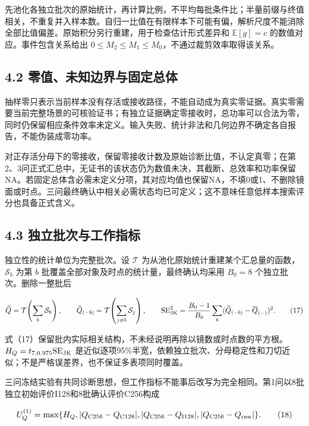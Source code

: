 \documentclass[UTF8,fontset=windows,zihao=-4]{ctexart}
\begin{document}
先池化各独立批次的原始统计，再计算比例，不平均每批条件比；半量前缀与终值相关，不重复并入样本数。自归一比值在有限样本下可能有偏，解析尺度不能消除全部比值偏差。原始积分另行重建，用于检查估计形式差异和 \(\mathbb E[g]=c\) 的数值对应。事件包含关系给出 \(0\le M_2\le M_1\le M_0\)，不通过裁剪效率取得该关系。

\subsection*{4.2 零值、未知边界与固定总体}

抽样零只表示当前样本没有存活或接收路径，不能自动成为真实零证据。真实零需要当前完整场景的可核验证书；有独立证据确定零接收时，总功率可以合法为零，同时仍保留相应条件效率未定义。输入失败、统计非法和几何边界不确定各自报告，不能伪装成零功率。

对正存活分母下的零接收，保留零接收计数及原始诊断比值，不认定真零；在第2、3问正式汇总中，无证书的该状态仍为数值未决，其截断、总效率和功率保留NA。若固定总体含必需未定义分项，其对应均值也保留NA，不填0或1、不删除镜面或时点。三问最终确认中相关必需状态均已可定义；这不意味任意低样本搜索评分也具备正式含义。

\subsection*{4.3 独立批次与工作指标}

\par\noindent\begin{minipage}{\linewidth}
独立性的统计单位为完整批次。设 \(\mathcal T\) 为从池化原始统计重建某个汇总量的函数，\(\mathcal S_b\) 为第 \(b\) 批覆盖全部对象及时点的统计量，最终确认均采用 \(B_0=8\) 个独立批次。删除一整批后

\[
\widehat Q=\mathcal T\!\left(\sum_b\mathcal S_b\right),\qquad
\widehat Q_{(-b)}=\mathcal T\!\left(\sum_{j\ne b}\mathcal S_j\right),\qquad
\mathrm{SE}_{\rm JK}^2=\frac{B_0-1}{B_0}\sum_b(\widehat Q_{(-b)}-\overline Q_{(-)})^2.
\tag{17}
\]
\end{minipage}\par

式（17）保留批内实际相关结构，不未经说明再除以镜数或时点数的平方根。\(H_Q=t_{7,0.975}\mathrm{SE}_{\rm JK}\) 是近似逐项95\%半宽，依赖独立批次、分母稳定性和刀切近似；不是严格误差界，也不保证多表项同时覆盖。

\par\noindent\begin{minipage}{\linewidth}
三问冻结实验有共同诊断思想，但工作指标不能事后改写为完全相同。第1问以8批独立初始评价I128和8批确认评价C256构成

\[
U_Q^{(1)}=\max\{H_Q,|Q_{\rm C256}-Q_{\rm C128}|,
|Q_{\rm C256}-Q_{\rm I128}|,|Q_{\rm C256}-Q_{\rm raw}|\}.
\tag{18}
\]
\end{minipage}\par
\end{document}
